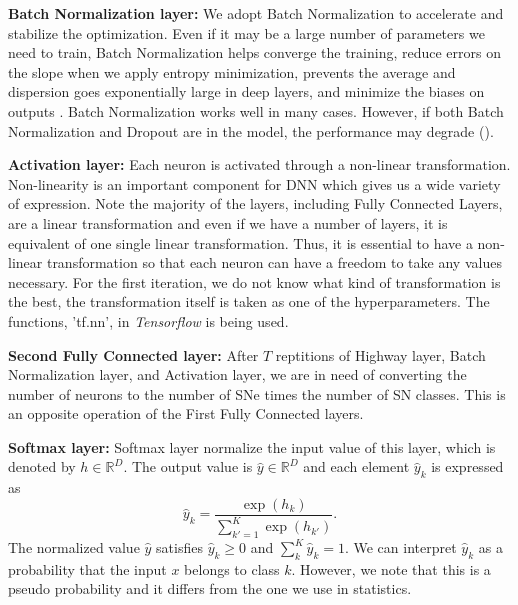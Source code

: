\documentclass[useamsfonts]{pasj01}
\begin{document}
{\bf Batch Normalization layer:}
We adopt Batch Normalization \citep{batch_norm} to accelerate and stabilize the optimization. Even if it may be a large number of parameters we need to train, Batch Normalization helps converge the training, reduce errors on the slope when we apply entropy minimization, prevents the average and dispersion goes exponentially large in deep layers, and minimize the biases on outputs \citep{understanding_batch_norm}.
Batch Normalization works well in many cases. However, if both Batch Normalization and Dropout are in the model, the performance may degrade (\cite{dropout_and_batch_norm}).   

{\bf Activation layer:}
Each neuron is activated through a non-linear transformation.  Non-linearity is an important component for DNN which gives us a wide variety of expression.   Note the majority of the layers, including Fully Connected Layers, are a linear transformation and even if we have a number of layers, it is equivalent of one single linear transformation.   Thus, it is essential to have a non-linear transformation so that each neuron can have a freedom to take any values necessary.
For the first iteration, we do not know what kind of transformation is the best, the transformation itself is taken as one of the hyperparameters.  The functions, 'tf.nn', in {\it Tensorflow} is being used.

{\bf Second Fully Connected layer:}
After $T$ reptitions of Highway layer, Batch Normalization layer, and Activation layer,
we are in need of converting the number of neurons to the number of SNe times the number of SN classes.   This is an opposite operation of the First Fully Connected layers.

{\bf Softmax layer:}
Softmax layer normalize the input value of this layer, which is denoted by $h \in \mathbb{R}^D$. The output value is $\hat{y} \in \mathbb{R}^D$ and each element $\hat{y}_k$ is expressed as
\begin{equation}
    \hat{y}_k = \frac{\exp \left( h_k \right)}{\sum_{k'=1}^K \exp \left( h_{k'} \right)}.
\end{equation}
The normalized value $\hat{y}$ satisfies $\hat{y}_k \geq 0$ and $\sum_k^K \hat{y}_k =1$.
We can interpret $\hat{y}_k$ as a probability that the input $x$ belongs to class $k$.
However, we note that this is a pseudo probability and it differs from the one we use in statistics.
  
\end{document}
